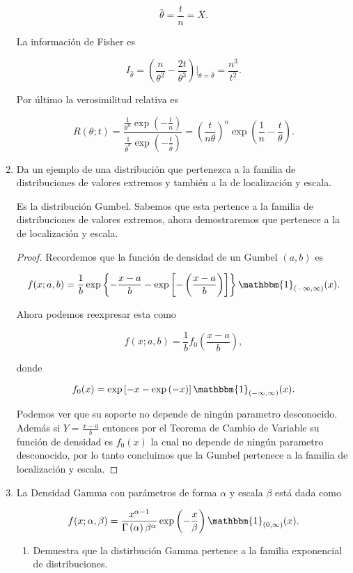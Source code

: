 \documentclass[letterpaper]{article}
\theoremstyle{definition}
\theoremstyle{lemathm}
\theoremstyle{lemathm}
\theoremstyle{lemathm}
\theoremstyle{lemademthm}
\newcommand{\pars}[1]{\left( #1 \right) }
\newcommand{\bracs}[1]{\left[ #1 \right] }
\newcommand{\set}[1]{\left \{ #1 \right\} }
\newcommand{\1}{\mathbbm{1}}
\begin{document}
\begin{enumerate}
		\[\hat{\theta} = \frac{t}{n} = \overline{X}.\]

		La información de Fisher es

		\[I_{\hat{\theta}} = \pars{\frac{n}{\theta^2}-\frac{2t}{\theta^3}}\bigg\rvert_{\theta=\hat{\theta}} = \frac{n^3}{t^2}.\]

		Por último la verosimilitud relativa es

		\[R(\theta;t) = \frac{\frac{1}{\theta^n}\exp\pars{-\frac{t}{n}}}{\frac{1}{\hat{\theta}^n}\exp\pars{-\frac{t}{\hat{\theta}}}} = \pars{\frac{t}{n\theta}}^n\exp\pars{\frac{1}{n}-\frac{t}{\theta}}.\]

		\item Da un ejemplo de una distribución que pertenezca a la familia de distribuciones de valores extremos y también a la de localización y escala.
		
		Es la distribución Gumbel. Sabemos que esta pertence a la familia de distribuciones de valores extremos, ahora demostraremos que pertenece a la de localización y escala.

		\begin{proof}
			Recordemos que la función de densidad de un Gumbel $(a,b)$ es

			\[f(x; a,b) = \frac{1}{b}\exp\set{-\frac{x-a}{b}-\exp\bracs{-\pars{\frac{x-a}{b}}}}\1_{\pars{-\infty,\infty}}(x).\]

			Ahora podemos reexpresar esta como

			\[f(x; a,b) = \frac{1}{b}f_0\pars{\frac{x-a}{b}},\]

			donde

			\[f_0(x) = \exp\bracs{-x-\exp\pars{-x}}\1_{\pars{-\infty,\infty}}(x).\]

			Podemos ver que su soporte no depende de ningún parametro desconocido. Además si $Y = \frac{x-a}{b}$ entonces por el Teorema de Cambio de Variable su función de densidad es $f_0(x)$ la cual no depende de ningún parametro desconocido, por lo tanto concluimos que la Gumbel pertenece a la familia de localización y escala.
		\end{proof}

		\item La Densidad Gamma con parámetros de forma $\alpha$ y escala $\beta$ está dada como
		
		\[f(x;\alpha,\beta) = \frac{x^{\alpha-1}}{\Gamma\pars{\alpha}\beta^{\alpha}}\exp\pars{-\frac{x}{\beta}}\1_{\pars{0,\infty}}(x).\]

		\begin{enumerate}
			\item Demuestra que la distirbución Gamma pertence a la familia exponencial de distribuciones.
			

\end{enumerate}
\end{enumerate}
\end{document}
